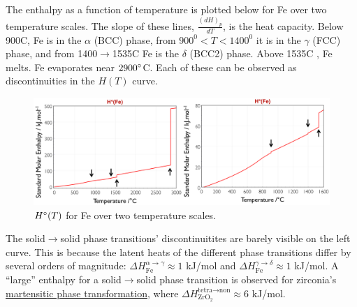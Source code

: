 \documentclass[12pt]{article}
\begin{document}
The enthalpy as a function of temperature is plotted below for Fe over two temperature scales. The slope of these lines, $\frac{(dH)_p}{dT}$, is the heat capacity.  Below 900\degree C, Fe is in the $\alpha$ (BCC) phase, from $900^0 < T < 1400^0$ it is in the $\gamma$ (FCC) phase, and from 1400$\to$1535\degree C Fe is the $\delta$ (BCC2) phase. Above 1535\degree C , Fe melts. Fe evaporates near $2900 \degree$C. Each of these can be observed as discontinuities in the $H(T)$ curve. \\
\begin{figure}[h]
\centering
\includegraphics[width = \textwidth]{H_of_T_labeled.png}
\caption{$H\degree (T)$ for Fe over two temperature scales.}
\label{enthalpy_vs_T}
\end{figure}
The solid$\to$solid phase transitions' discontinuitites are barely visible on the left curve. This is because the latent heats of the different phase transitions differ by several orders of magnitude: $\Delta H_\text{Fe}^{\alpha \rightarrow \gamma} \approx 1$ kJ/mol and $\Delta H_\text{Fe}^{\gamma \rightarrow \delta} \approx 1$ kJ/mol. A ``large'' enthalpy for a solid$\to$solid phase transition is observed for zirconia's \href{http://en.wikipedia.org/wiki/Diffusionless_transformation#Martensitic_transformation}{martensitic phase transformation}, where $\Delta H_{\text{ZrO}_2}^{\text{tetra}\rightarrow \text{non}} \approx 6$ kJ/mol.  
\end{document}
